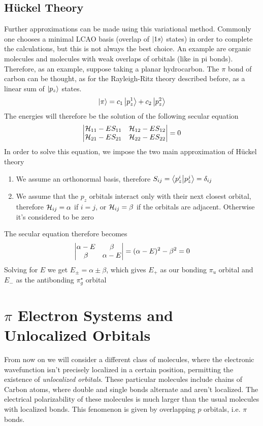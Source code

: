 \documentclass[../qm.tex]{subfiles}
\begin{document}
\subsection{Hückel Theory}
Further approximations can be made using this variational method. Commonly one chooses a minimal LCAO basis (overlap of $\ket{1s}$ states) in order to complete the calculations, but this is not always the best choice. An example are organic molecules and molecules with weak overlaps of orbitals (like in pi bonds). Therefore, as an example, suppose taking a planar hydrocarbon. The $\pi$ bond of carbon can be thought, as for the Rayleigh-Ritz theory described before, as a linear sum of $\ket{p_z}$ states.
\begin{equation}
	\ket{\pi}=c_1\ket{p_z^1}+c_2\ket{p_z^2}
	\label{eq:pibondhuckel}
\end{equation}
The energies will therefore be the solution of the following secular equation
\begin{equation}
	\abs{\begin{matrix}
			\mathcal{H}_{11}-ES_{11}&\mathcal{H}_{12}-ES_{12}\\
			\mathcal{H}_{21}-ES_{21}&\mathcal{H}_{22}-ES_{22}
\end{matrix}}=0
	\label{eq:seculardet}
\end{equation}
In order to solve this equation, we impose the two main approximation of Hückel theory
\begin{enumerate}
\item We assume an orthonormal basis, therefore $S_{ij}=\bra{p_{z}^i}\ket{p_{z}^j}=\delta_{ij}$
\item We assume that the $p_z$ orbitals interact only with their next closest orbital, therefore $\mathcal{H}_{ij}=\alpha$ if $i=j$, or $\mathcal{H}_{ij}=\beta$ if the orbitals are adjacent. Otherwise it's considered to be zero
\end{enumerate}
The secular equation therefore becomes
\begin{equation}
	\abs{\begin{matrix}
		\alpha-E&\beta\\
		\beta&\alpha-E
\end{matrix}}=(\alpha-E)^2-\beta^2=0
	\label{eq:secularhuckel}
\end{equation}
Solving for $E$ we get $E_\pm=\alpha\pm\beta$, which gives $E_+$ as our bonding $\pi_u$ orbital and $E_-$ as the antibonding $\pi^\star_g$ orbital
\section{$\pi$ Electron Systems and Unlocalized Orbitals}
	From now on we will consider a different class of molecules, where the electronic wavefunction isn't precisely localized in a certain position, permitting the existence of \textit{unlocalized orbitals}. These particular molecules include chains of Carbon atoms, where double and single bonds alternate and aren't localized. The electrical polarizability of these molecules is much larger than the usual molecules with localized bonds. This fenomenon is given by overlapping $p$ orbitals, i.e. $\pi$ bonds.
\end{document}
